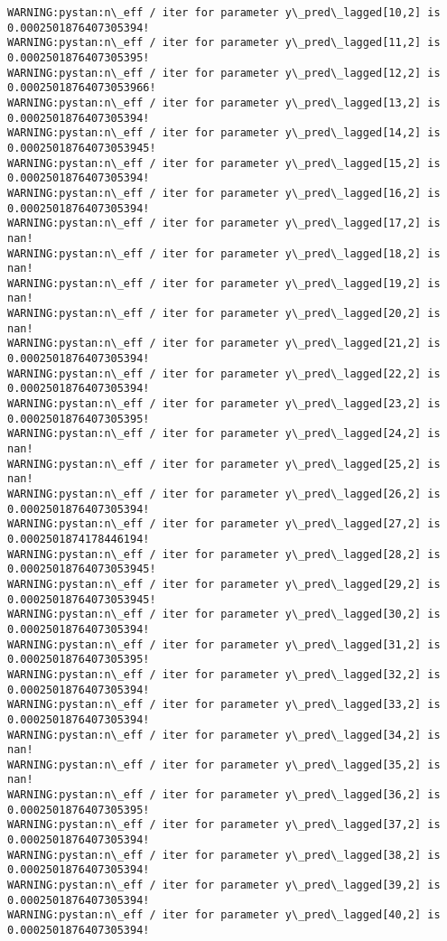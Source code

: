 \documentclass[11pt]{article}
\begin{document}
\begin{Verbatim}[commandchars=\\\{\}]
WARNING:pystan:n\_eff / iter for parameter y\_pred\_lagged[10,2] is 0.0002501876407305394!
WARNING:pystan:n\_eff / iter for parameter y\_pred\_lagged[11,2] is 0.0002501876407305395!
WARNING:pystan:n\_eff / iter for parameter y\_pred\_lagged[12,2] is 0.00025018764073053966!
WARNING:pystan:n\_eff / iter for parameter y\_pred\_lagged[13,2] is 0.0002501876407305394!
WARNING:pystan:n\_eff / iter for parameter y\_pred\_lagged[14,2] is 0.00025018764073053945!
WARNING:pystan:n\_eff / iter for parameter y\_pred\_lagged[15,2] is 0.0002501876407305394!
WARNING:pystan:n\_eff / iter for parameter y\_pred\_lagged[16,2] is 0.0002501876407305394!
WARNING:pystan:n\_eff / iter for parameter y\_pred\_lagged[17,2] is nan!
WARNING:pystan:n\_eff / iter for parameter y\_pred\_lagged[18,2] is nan!
WARNING:pystan:n\_eff / iter for parameter y\_pred\_lagged[19,2] is nan!
WARNING:pystan:n\_eff / iter for parameter y\_pred\_lagged[20,2] is nan!
WARNING:pystan:n\_eff / iter for parameter y\_pred\_lagged[21,2] is 0.0002501876407305394!
WARNING:pystan:n\_eff / iter for parameter y\_pred\_lagged[22,2] is 0.0002501876407305394!
WARNING:pystan:n\_eff / iter for parameter y\_pred\_lagged[23,2] is 0.0002501876407305395!
WARNING:pystan:n\_eff / iter for parameter y\_pred\_lagged[24,2] is nan!
WARNING:pystan:n\_eff / iter for parameter y\_pred\_lagged[25,2] is nan!
WARNING:pystan:n\_eff / iter for parameter y\_pred\_lagged[26,2] is 0.0002501876407305394!
WARNING:pystan:n\_eff / iter for parameter y\_pred\_lagged[27,2] is 0.0002501874178446194!
WARNING:pystan:n\_eff / iter for parameter y\_pred\_lagged[28,2] is 0.00025018764073053945!
WARNING:pystan:n\_eff / iter for parameter y\_pred\_lagged[29,2] is 0.00025018764073053945!
WARNING:pystan:n\_eff / iter for parameter y\_pred\_lagged[30,2] is 0.0002501876407305394!
WARNING:pystan:n\_eff / iter for parameter y\_pred\_lagged[31,2] is 0.0002501876407305395!
WARNING:pystan:n\_eff / iter for parameter y\_pred\_lagged[32,2] is 0.0002501876407305394!
WARNING:pystan:n\_eff / iter for parameter y\_pred\_lagged[33,2] is 0.0002501876407305394!
WARNING:pystan:n\_eff / iter for parameter y\_pred\_lagged[34,2] is nan!
WARNING:pystan:n\_eff / iter for parameter y\_pred\_lagged[35,2] is nan!
WARNING:pystan:n\_eff / iter for parameter y\_pred\_lagged[36,2] is 0.0002501876407305395!
WARNING:pystan:n\_eff / iter for parameter y\_pred\_lagged[37,2] is 0.0002501876407305394!
WARNING:pystan:n\_eff / iter for parameter y\_pred\_lagged[38,2] is 0.0002501876407305394!
WARNING:pystan:n\_eff / iter for parameter y\_pred\_lagged[39,2] is 0.0002501876407305394!
WARNING:pystan:n\_eff / iter for parameter y\_pred\_lagged[40,2] is 0.0002501876407305394!

\end{Verbatim}
\end{document}
